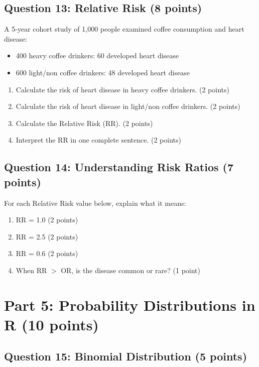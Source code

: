 \documentclass[11pt]{article}
\begin{document}
\subsection*{Question 13: Relative Risk (8 points)}

A 5-year cohort study of 1,000 people examined coffee consumption and heart disease:
\begin{itemize}
\item 400 heavy coffee drinkers: 60 developed heart disease
\item 600 light/non coffee drinkers: 48 developed heart disease
\end{itemize}

\begin{enumerate}[label=\alph*)]
\item Calculate the risk of heart disease in heavy coffee drinkers. (2 points)
\item Calculate the risk of heart disease in light/non coffee drinkers. (2 points)
\item Calculate the Relative Risk (RR). (2 points)
\item Interpret the RR in one complete sentence. (2 points)
\end{enumerate}

\vspace{1.5cm}

\subsection*{Question 14: Understanding Risk Ratios (7 points)}

For each Relative Risk value below, explain what it means:

\begin{enumerate}[label=\alph*)]
\item RR = 1.0 (2 points)
\item RR = 2.5 (2 points)
\item RR = 0.6 (2 points)
\item When RR $>$ OR, is the disease common or rare? (1 point)
\end{enumerate}

\vspace{1.5cm}

\section{Part 5: Probability Distributions in R (10 points)}

\subsection*{Question 15: Binomial Distribution (5 points)}
\end{document}
